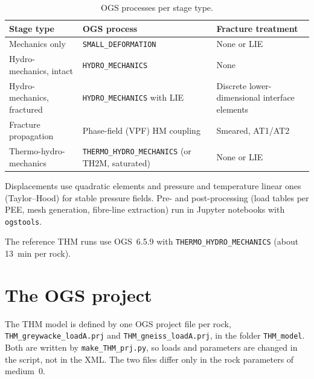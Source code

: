 \documentclass[11pt,a4paper]{article}
\begin{document}
\begin{table}[htbp]
\centering
\caption{OGS processes per stage type.}
\label{tab:ogs}
\begin{tabularx}{\textwidth}{@{}lLL@{}}
\toprule
Stage type & OGS process & Fracture treatment \\
\midrule
Mechanics only              & \texttt{SMALL\_DEFORMATION} & None or LIE \\
Hydro-mechanics, intact     & \texttt{HYDRO\_MECHANICS} & None \\
Hydro-mechanics, fractured  & \texttt{HYDRO\_MECHANICS} with LIE & Discrete lower-dimensional interface elements \\
Fracture propagation        & Phase-field (VPF) HM coupling & Smeared, AT1/AT2 \\
Thermo-hydro-mechanics      & \texttt{THERMO\_HYDRO\_MECHANICS} (or TH2M, saturated) & None or LIE \\
\bottomrule
\end{tabularx}
\end{table}

Displacements use quadratic elements and pressure and temperature linear ones
(Taylor--Hood) for stable pressure fields. Pre- and post-processing (load tables
per PEE, mesh generation, fibre-line extraction) run in Jupyter notebooks with
\texttt{ogstools}.

The reference THM runs use OGS~6.5.9 with \texttt{THERMO\_HYDRO\_MECHANICS}
(about 13~min per rock).

\section{The OGS project}
The THM model is defined by one OGS project file per rock,
\texttt{THM\_greywacke\_loadA.prj} and \texttt{THM\_gneiss\_loadA.prj}, in the
folder \texttt{THM\_model}. Both are written by \texttt{make\_THM\_prj.py}, so
loads and parameters are changed in the script, not in the XML. The two files
differ only in the rock parameters of medium~0.
\end{document}
